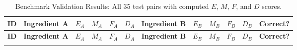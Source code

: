 \documentclass[12pt,a3paper]{article}
\begin{document}
\begin{longtable}{
    p{0.7cm}
    p{3.8cm}
    >{\centering\arraybackslash}p{1.0cm}
    >{\centering\arraybackslash}p{1.0cm}
    >{\centering\arraybackslash}p{1.0cm}
    >{\centering\arraybackslash}p{1.0cm}
    p{3.8cm}
    >{\centering\arraybackslash}p{1.0cm}
    >{\centering\arraybackslash}p{1.0cm}
    >{\centering\arraybackslash}p{1.0cm}
    >{\centering\arraybackslash}p{1.0cm}
    p{1.6cm}
}
\caption{Benchmark Validation Results: All 35 test pairs with computed $E$, $M$, $F$, and $D$ scores.}\label{tab:validation}\\
\toprule
\textbf{ID} & \textbf{Ingredient A} & \textbf{$E_A$} & \textbf{$M_A$} & \textbf{$F_A$} & \textbf{$D_A$} & \textbf{Ingredient B} & \textbf{$E_B$} & \textbf{$M_B$} & \textbf{$F_B$} & \textbf{$D_B$} & \textbf{Correct?} \\
\midrule
\endfirsthead
\toprule
\textbf{ID} & \textbf{Ingredient A} & \textbf{$E_A$} & \textbf{$M_A$} & \textbf{$F_A$} & \textbf{$D_A$} & \textbf{Ingredient B} & \textbf{$E_B$} & \textbf{$M_B$} & \textbf{$F_B$} & \textbf{$D_B$} & \textbf{Correct?} \\
\midrule
\endhead
\bottomrule
\endfoot


\end{longtable}
\end{document}
